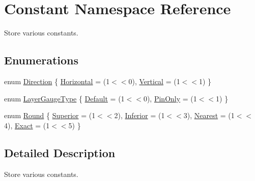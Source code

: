 \hypertarget{namespaceConstant}{}\section{Constant Namespace Reference}
\label{namespaceConstant}


Store various constants.  


\subsection*{Enumerations}
\begin{DoxyCompactItemize}
\item 
enum \hyperlink{namespaceConstant_ac081a99f2b64361919ed5d9f37c0f9af}{Direction} \{ \newline
\hyperlink{namespaceConstant_ac081a99f2b64361919ed5d9f37c0f9afa7a545ff2d744fe30bfac294dfe9d03db}{Horizontal} = (1$<$$<$0), 
\newline
\hyperlink{namespaceConstant_ac081a99f2b64361919ed5d9f37c0f9afa63ce9cc57c99cccca96aa1157113da34}{Vertical} = (1$<$$<$1)
 \}
\item 
enum \hyperlink{namespaceConstant_ab2e46a17cc373a268c5c24fa0e2067e5}{Layer\+Gauge\+Type} \{ \newline
\hyperlink{namespaceConstant_ab2e46a17cc373a268c5c24fa0e2067e5ac83c789478a5dfedee2496415c62c1fb}{Default} = (1$<$$<$0), 
\newline
\hyperlink{namespaceConstant_ab2e46a17cc373a268c5c24fa0e2067e5a816e7f6e3fb44de0c2da893f32a6748e}{Pin\+Only} = (1$<$$<$1)
 \}
\item 
enum \hyperlink{namespaceConstant_abb6258ce09861f20cfe37b49d9a3515f}{Round} \{ \newline
\hyperlink{namespaceConstant_abb6258ce09861f20cfe37b49d9a3515faaf5371ebaadbfde8cd93c7e56aecb3c2}{Superior} = (1$<$$<$2), 
\newline
\hyperlink{namespaceConstant_abb6258ce09861f20cfe37b49d9a3515fa1140f16a605cb6cc263e206dcc2c90c9}{Inferior} = (1$<$$<$3), 
\newline
\hyperlink{namespaceConstant_abb6258ce09861f20cfe37b49d9a3515fac3c18902fbd4fbc14431d14904b35d61}{Nearest} = (1$<$$<$4), 
\newline
\hyperlink{namespaceConstant_abb6258ce09861f20cfe37b49d9a3515fa8c19f155f88d2db98534c1aec454862d}{Exact} = (1$<$$<$5)
 \}
\end{DoxyCompactItemize}


\subsection{Detailed Description}
Store various constants. 

